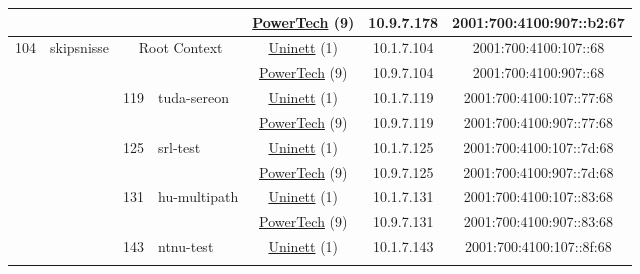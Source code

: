 \begin{small}
\begin{center}
\begin{longtable}{|c|c|c|c|c|c|c|c|}
  &  &  &  & \multicolumn{2}{|c|}{\tiny{\href{http://www.powertech.no}{PowerTech} (9)}} & \tiny{10.9.7.178} & \tiny{2001:700:4100:907::b2:67} \\ \hline
 \multirow{30}{*}{\tiny{104}} & \multicolumn{1}{|l|}{\multirow{30}{*}{\tiny{skipsnisse}}} & \multicolumn{2}{|c|}{\multirow{2}{*}{\tiny{Root Context}}} & \multicolumn{2}{|c|}{\tiny{\href{https://www.uninett.no}{Uninett} (1)}} & \tiny{10.1.7.104} & \tiny{2001:700:4100:107::68} \\* \cline{5-5}\cline{6-6}\cline{7-7}\cline{8-8}
  &  & \multicolumn{2}{|c|}{} & \multicolumn{2}{|c|}{\tiny{\href{http://www.powertech.no}{PowerTech} (9)}} & \tiny{10.9.7.104} & \tiny{2001:700:4100:907::68} \\* \cline{3-3}\cline{4-4}\cline{5-5}\cline{6-6}\cline{7-7}\cline{8-8}
  &  & \multirow{2}{*}{\tiny{119}} & \multicolumn{1}{|l|}{\multirow{2}{*}{\tiny{tuda-sereon}}} & \multicolumn{2}{|c|}{\tiny{\href{https://www.uninett.no}{Uninett} (1)}} & \tiny{10.1.7.119} & \tiny{2001:700:4100:107::77:68} \\* \cline{5-5}\cline{6-6}\cline{7-7}\cline{8-8}
  &  &  &  & \multicolumn{2}{|c|}{\tiny{\href{http://www.powertech.no}{PowerTech} (9)}} & \tiny{10.9.7.119} & \tiny{2001:700:4100:907::77:68} \\* \cline{3-3}\cline{4-4}\cline{5-5}\cline{6-6}\cline{7-7}\cline{8-8}
  &  & \multirow{2}{*}{\tiny{125}} & \multicolumn{1}{|l|}{\multirow{2}{*}{\tiny{srl-test}}} & \multicolumn{2}{|c|}{\tiny{\href{https://www.uninett.no}{Uninett} (1)}} & \tiny{10.1.7.125} & \tiny{2001:700:4100:107::7d:68} \\* \cline{5-5}\cline{6-6}\cline{7-7}\cline{8-8}
  &  &  &  & \multicolumn{2}{|c|}{\tiny{\href{http://www.powertech.no}{PowerTech} (9)}} & \tiny{10.9.7.125} & \tiny{2001:700:4100:907::7d:68} \\* \cline{3-3}\cline{4-4}\cline{5-5}\cline{6-6}\cline{7-7}\cline{8-8}
  &  & \multirow{2}{*}{\tiny{131}} & \multicolumn{1}{|l|}{\multirow{2}{*}{\tiny{hu-multipath}}} & \multicolumn{2}{|c|}{\tiny{\href{https://www.uninett.no}{Uninett} (1)}} & \tiny{10.1.7.131} & \tiny{2001:700:4100:107::83:68} \\* \cline{5-5}\cline{6-6}\cline{7-7}\cline{8-8}
  &  &  &  & \multicolumn{2}{|c|}{\tiny{\href{http://www.powertech.no}{PowerTech} (9)}} & \tiny{10.9.7.131} & \tiny{2001:700:4100:907::83:68} \\* \cline{3-3}\cline{4-4}\cline{5-5}\cline{6-6}\cline{7-7}\cline{8-8}
  &  & \multirow{2}{*}{\tiny{143}} & \multicolumn{1}{|l|}{\multirow{2}{*}{\tiny{ntnu-test}}} & \multicolumn{2}{|c|}{\tiny{\href{https://www.uninett.no}{Uninett} (1)}} & \tiny{10.1.7.143} & \tiny{2001:700:4100:107::8f:68} \\* \cline{5-5}\cline{6-6}\cline{7-7}\cline{8-8}

\end{longtable}
\end{center}
\end{small}
